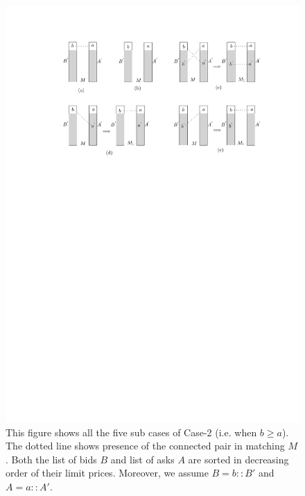 \documentclass[a4paper,UKenglish,cleveref, autoref]{lipics-v2019}
\begin{document}
\begin{itemize}
\begin{figure}[h!]
\centering
\includegraphics[width=1\textwidth]{mm_proof.pdf}
\caption{This figure shows all the five sub cases of Case-2 (i.e. when $b \geq a$). The dotted line shows presence of the connected pair in matching $M$.  Both the list of bids $B$ and list of asks $A$ are sorted in decreasing order of their limit prices. Moreover, we assume $B = b::B'$ and $A = a::A'$.  }
\label{fig:mmProof}
\end{figure}


\end{itemize}
\end{document}
